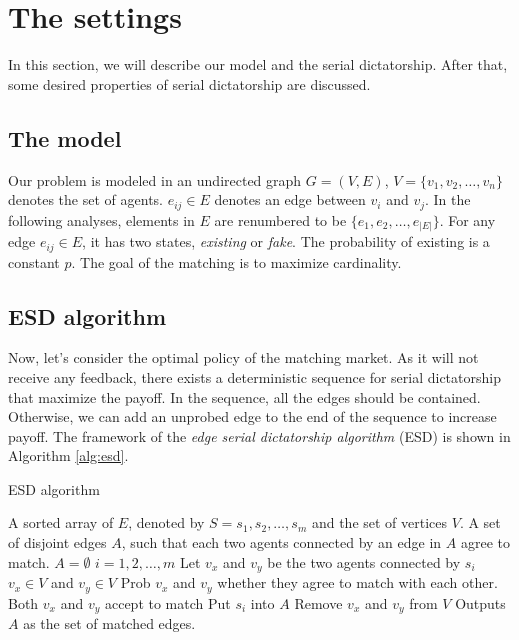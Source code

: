 \documentclass[letterpaper]{article}
\begin{document}
\section{The settings}

In this section, we will describe our model and the serial dictatorship. After that, some desired properties of serial dictatorship are discussed.

\subsection{The model}

Our problem is modeled in an undirected graph $G=(V,E)$, $V=\{v_1,v_2,\ldots,v_n\}$ denotes the set of agents. $e_{ij}\in E$ denotes an edge between $v_i$ and $v_j$. In the following analyses, elements in $E$ are renumbered to be $\{e_1,e_2,\ldots,e_{|E|}\}$. 
For any edge $e_{ij}\in E$, it has two states, \textit{existing} or \textit{fake}.
The probability of existing is a constant $p$.
The goal of the matching is to maximize cardinality.


\subsection{ESD algorithm}

Now, let's consider the optimal policy of the matching market.
As it will not receive any feedback, there exists a deterministic sequence for serial dictatorship that maximize the payoff.
In the sequence, all the edges should be contained. Otherwise, we can add an unprobed edge to the end of the sequence to increase payoff.
The framework of the \textit{edge serial dictatorship algorithm} (ESD) is shown in Algorithm \ref{alg:esd}.

\begin{algorithm}
	\caption{ESD algorithm}
	\label{alg:esd}
	\begin{algorithmic}[1]
		\Require
		A sorted array of $E$, denoted by $S=s_1,s_2,\ldots,s_m$ and the set of vertices $V$.
		\Ensure A set of disjoint edges $A$, such that each two agents connected by an edge in $A$ agree to match. 
		\State $A=\emptyset$
		\For $i=1,2,\ldots,m$
		\State Let $v_x$ and $v_y$ be the two agents connected by $s_i$
		\If $v_x\in V$ and $v_y\in V$
		\State Prob $v_x$ and $v_y$ whether they agree to match with each other.
		\If Both $v_x$ and $v_y$ accept to match
		\State Put $s_i$ into $A$
		\State Remove $v_x$ and $v_y$ from $V$
		\EndIf
		\EndIf
		\EndFor
		\State Outputs $A$ as the set of matched edges.
	\end{algorithmic}
\end{algorithm}
\end{document}
